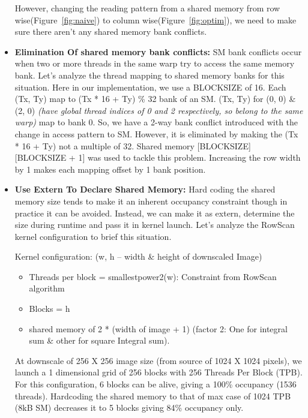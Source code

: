 \begin{itemize}
However, changing the reading pattern from a shared memory from 
row wise(Figure~\ref{fig:naive}) to column wise(Figure~\ref{fig:optim}), we need to make sure there 
aren’t any shared memory bank conflicts.

\vspace{0.1in}
\item \textbf{Elimination Of shared memory bank conflicts:}
SM bank conflicts occur when two or more threads in the same warp try to access the same memory bank. 
Let’s analyze the thread mapping to shared memory banks for this situation. Here in our implementation, 
we use a BLOCKSIZE of  16. Each (Tx, Ty) map to (Tx * 16 + Ty) \% 32  bank of an SM. (Tx, Ty) for (0, 0) \& (2, 0) 
\textit{(have global thread indices of 0 and 2 respectively, so belong to the same warp)} map to bank 0. 
So, we have a 2-way bank conflict introduced with the change in access pattern to SM. However, 
it is eliminated by making the (Tx * 16 + Ty) not a multiple of 32. 
Shared memory [BLOCKSIZE] [BLOCKSIZE + 1] was used to tackle this problem. 
Increasing the row width by 1 makes each mapping offset by 1 bank position.


\vspace{0.1in}
\item  \textbf{Use Extern To Declare Shared Memory:}
Hard coding the shared memory size tends to make it an inherent occupancy constraint 
though in practice it can be avoided. Instead, we can make it as extern, 
determine the size during runtime and pass it in kernel launch. Let’s analyze the 
RowScan kernel configuration to brief this situation.  

Kernel configuration: (w, h – width \& height of downscaled Image)
\begin{itemize}
    \item Threads per block = smallestpower2(w): Constraint from RowScan algorithm
    \item Blocks = h
    \item shared memory of 2 * (width of image + 1) (factor 2: One for integral sum \& other for square Integral sum).
\end{itemize}
At downscale of 256 X 256 image size (from source of 1024 X 1024 pixels), we launch a 1 dimensional 
grid of 256 blocks with 256 Threads Per Block (TPB). For this configuration, 6 blocks can be alive, 
giving a 100\% occupancy (1536 threads). Hardcoding the shared memory to that of max case 
of 1024 TPB (8kB SM)  decreases it to 5 blocks giving 84\% occupancy only. 

\end{itemize}


